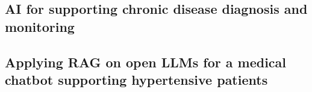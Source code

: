 \subsection{ \Gls{AI} for supporting chronic disease diagnosis and monitoring}\label{subsec:nesy-ai-for-supporting-chronic-disease-diagnosis-and-monitoring}



\subsection{Applying \Gls{RAG} on open \Glspl{LLM} for a medical chatbot supporting hypertensive patients}\label{subsec:applying-rag-on-open-llm-for-a-medical-chatbot-supporting-hypertensive-patients}